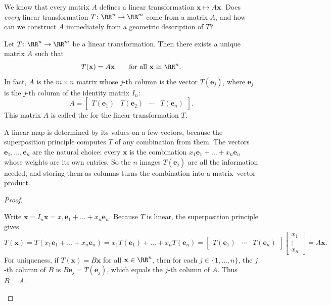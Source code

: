 \documentclass[10pt]{scrartcl}
\newcommand{\vv}[1]{\mathbf{#1}}
\begin{document}
\begin{qbox}
  We know that every matrix $A$ defines a linear transformation $\vv x\mapsto A\vv x$. Does \emph{every} linear transformation $T\colon\RR^n\to\RR^m$ come from a matrix $A$, and how can we construct $A$ immediately from a geometric description of $T$?
\end{qbox}

\begin{theorem*}
  Let $T\colon\RR^n\to\RR^m$ be a linear transformation. Then there exists a unique matrix $A$ such that
  \[
    T(\vv x) = A\vv x \qquad\text{for all }\vv x\text{ in }\RR^n.
  \]
  In fact, $A$ is the $m\times n$ matrix whose $j$-th column is the vector $T(\vv e_j)$, where $\vv e_j$ is the $j$-th column of the identity matrix $I_n$:
  \[
    A = \begin{bmatrix} T(\vv e_1) & T(\vv e_2) & \cdots & T(\vv e_n) \end{bmatrix}.
  \]
  This matrix $A$ is called the  for the linear transformation $T$.
\end{theorem*}
\begin{ideabox}
  A linear map is determined by its values on a few vectors, because the superposition principle computes $T$ of any combination from them. The vectors $\vv e_1,\dots,\vv e_n$ are the natural choice: every $\vv x$ is the combination $x_1\vv e_1+\dots+x_n\vv e_n$ whose weights are its own entries. So the $n$ images $T(\vv e_j)$ are all the information needed, and storing them as columns turns the combination into a matrix--vector product.
\end{ideabox}
\begin{proof}
  \begin{steps}
    \ii Write $\vv x=I_n\vv x=x_1\vv e_1+\dots+x_n\vv e_n$. Because $T$ is linear, the superposition principle gives
    \[
      T(\vv x) = T(x_1\vv e_1+\dots+x_n\vv e_n) = x_1T(\vv e_1) + \dots + x_nT(\vv e_n) = \begin{bmatrix} T(\vv e_1) & \cdots & T(\vv e_n) \end{bmatrix}\begin{bmatrix} x_1 \\ \vdots \\ x_n \end{bmatrix} = A\vv x.
    \]
    \ii For uniqueness, if $T(\vv x)=B\vv x$ for all $\vv x\in\RR^n$, then for each $j\in\{1,\dots,n\}$, the $j$-th column of $B$ is $B\vv e_j=T(\vv e_j)$, which equals the $j$-th column of $A$. Thus $B=A$.
  \end{steps}
\end{proof}
\end{document}
